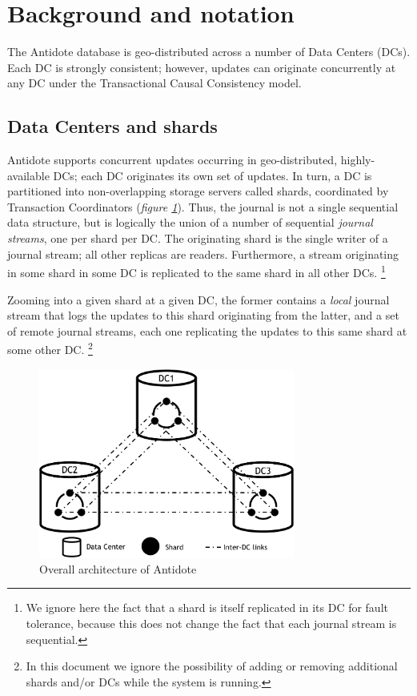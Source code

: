 \documentclass[twoside]{article}
\begin{document}
\section{Background and notation}
\label{sec:background}
The Antidote database is geo-distributed across a number of Data Centers
(DCs).
Each DC is strongly consistent; however, updates can originate
concurrently at any DC under the Transactional Causal Consistency model.

\subsection{Data Centers and shards}
\label{sec:dc-shards}
Antidote supports concurrent updates occurring in geo-distributed,
highly-available DCs; each DC originates its own set of updates.
In turn, a DC is partitioned into non-overlapping storage servers called
shards, coordinated by Transaction Coordinators (\emph{figure \ref{fig:architecture}}).
Thus, the journal is not a single sequential data structure, but is
logically the union of a number of sequential \emph{journal streams},
one per shard per DC\@.
The originating shard is the single writer of a journal stream; all 
other replicas are readers.
Furthermore, a stream originating in some shard in some DC is replicated
to the same shard in all other DCs.%
%
\footnote{
%
  We ignore here the fact that a shard is itself replicated in its DC
  for fault tolerance, because this does not change the fact that each
  journal stream is sequential.
}
%

Zooming into a given shard at a given DC, the former contains a \emph{local}
journal stream that logs the updates to this shard originating from the latter,
and a set of remote journal streams, each one replicating the
updates to this same shard at some other DC\@.
%
\footnote{
  In this document we ignore the possibility of adding or removing additional shards 
  and/or DCs while the system is running. 
}

\begin{figure}[tp]
  \centering
  \includegraphics[width=0.75\textwidth]{figures/datacentres.png}
  \caption{Overall architecture of Antidote}
  \label{fig:architecture}
\end{figure}
\end{document}
